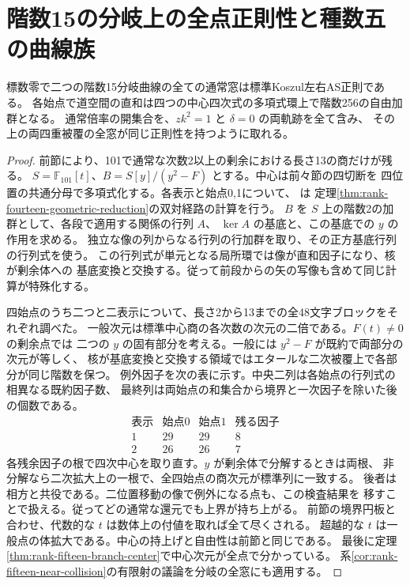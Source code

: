 \section{階数15の分岐上の全点正則性と種数五の曲線族}
\label{sec:rank-fifteen-all-ramification}
\begin{theorem}\label{thm:rank-fifteen-all-ramification}
標数零で二つの階数15分岐曲線の全ての通常窓は標準Koszul左右AS正則である。
各始点で道空間の直和は四つの中心四次式の多項式環上で階数256の自由加群となる。
通常倍率の開集合を、$zk^2=1$ と $\delta=0$ の両軌跡を全て含み、
その上の両四重被覆の全窓が同じ正則性を持つように取れる。
\end{theorem}
\begin{proof}
前節により、101で通常な次数2以上の剰余における長さ13の商だけが残る。
$S=\mathbb F_{101}[t]$、$B=S[y]/(y^2-F)$ とする。中心は前々節の四切断を
四位置の共通分母で多項式化する。各表示と始点0,1について、
 は
定理\ref{thm:rank-fourteen-geometric-reduction}の双対経路の計算を行う。
$B$ を $S$ 上の階数2の加群として、各段で適用する関係の行列 $A$、
$\ker A$ の基底と、この基底での $y$ の作用を求める。
独立な像の列からなる行列の行加群を取り、その正方基底行列の行列式を使う。
この行列式が単元となる局所環では像が直和因子になり、核が剰余体への
基底変換と交換する。従って前段からの矢の写像も含めて同じ計算が特殊化する。

四始点のうち二つと二表示について、長さ2から13までの全48文字ブロックをそれぞれ調べた。
一般次元は標準中心商の各次数の次元の二倍である。$F(t)\ne0$ の剰余点では
二つの $y$ の固有部分を考える。一般には $y^2-F$ が既約で両部分の次元が等しく、
核が基底変換と交換する領域ではエタールな二次被覆上で各部分が同じ階数を保つ。
例外因子を次の表に示す。中央二列は各始点の行列式の相異なる既約因子数、
最終列は両始点の和集合から境界と一次因子を除いた後の個数である。
\[
\begin{array}{c|rr|r}
 \text{表示}&\text{始点0}&\text{始点1}&\text{残る因子}\\ \hline
 1&29&29&8\\
 2&26&26&7
\end{array}
\]
各残余因子の根で四次中心を取り直す。$y$ が剰余体で分解するときは両根、
非分解なら二次拡大上の一根で、全四始点の商次元が標準列に一致する。
後者は相方と共役である。二位置移動の像で例外になる点も、この検査結果を
移すことで扱える。従ってどの通常な還元でも上界が持ち上がる。
前節の境界円板と合わせ、代数的な $t$ は数体上の付値を取れば全て尽くされる。
超越的な $t$ は一般点の体拡大である。中心の持上げと自由性は前節と同じである。
最後に定理\ref{thm:rank-fifteen-branch-center}で中心次元が全点で分かっている。
系\ref{cor:rank-fifteen-near-collision}の有限射の議論を分岐の全窓にも適用する。
\end{proof}


